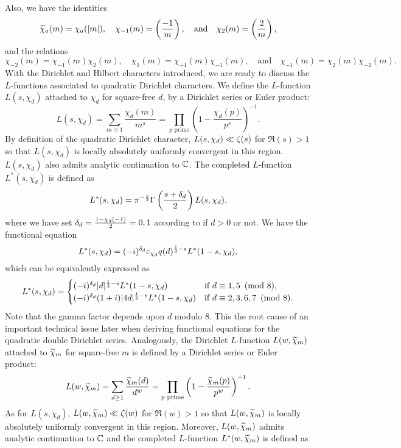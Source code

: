 \documentclass[12pt,reqno,oneside]{amsart}
\begin{document}
    Also, we have the identities
    \[
        \widetilde{\chi}_{a}(m) = \chi_{a}(|m|), \quad \chi_{-1}(m) = \left(\frac{-1}{m}\right), \quad \text{and} \quad \chi_{2}(m) = \left(\frac{2}{m}\right),
    \]
    and the relations
    \[
        \chi_{-2}(m) = \chi_{-1}(m)\chi_{2}(m), \quad \chi_{1}(m) = \chi_{-1}(m)\chi_{-1}(m), \quad \text{and} \quad \chi_{-1}(m) = \chi_{2}(m)\chi_{-2}(m).
    \]
    With the Dirichlet and Hilbert characters introduced, we are ready to discuss the $L$-functions associated to quadratic Dirichlet characters. We define the $L$-function $L(s,\chi_{d})$ attached to $\chi_{d}$ for square-free $d$, by a Dirichlet series or Euler product:
    \[
        L(s,\chi_{d}) = \sum_{m \ge 1}\frac{\chi_{d}(m)}{m^{s}} = \prod_{p \text{ prime}}\left(1-\frac{\chi_{d}(p)}{p^{s}}\right)^{-1}.
    \]
    By definition of the quadratic Dirichlet character, $L(s,\chi_{d}) \ll \zeta(s)$ for $\Re(s) > 1$ so that $L(s,\chi_{d})$ is locally absolutely uniformly convergent in this region. $L(s,\chi_{d})$ also admits analytic continuation to $\mathbb{C}$. The completed $L$-function $L^{\ast}(s,\chi_{d})$ is defined as
    \[
        L^{\ast}(s,\chi_{d}) = \pi^{-\frac{s}{2}}\Gamma\left(\frac{s+\delta_{d}}{2}\right)L(s,\chi_{d}),
    \]
    where we have set $\delta_{d} = \frac{1-\chi_{d}(-1)}{2} = 0,1$ according to if $d > 0$ or not. We have the functional equation
    \[
        L^{\ast}(s,\chi_{d}) = (-i)^{\delta_{d}}\varepsilon_{\chi_{d}}q(d)^{\frac{1}{2}-s}L^{\ast}(1-s,\chi_{d}),
    \]
    which can be equivalently expressed as
    \[
        L^{\ast}(s,\chi_{d}) = \begin{cases} (-i)^{\delta_{d}}|d|^{\frac{1}{2}-s}L^{\ast}(1-s,\chi_{d}) & \text{if $d \equiv 1,5 \ \left(\text{mod }8\right)$}, \\ (-i)^{\delta_{d}}(1+i)|4d|^{\frac{1}{2}-s}L^{\ast}(1-s,\chi_{d}) & \text{if $d \equiv 2,3,6,7 \ \left(\text{mod }8\right)$}. \end{cases}
    \]
    Note that the gamma factor depends upon $d$ modulo $8$. This the root cause of an important technical issue later when deriving functional equations for the quadratic double Dirichlet series. Analogously, the Dirichlet $L$-function $L(w,\widetilde{\chi}_{m})$ attached to $\widetilde{\chi}_{m}$ for square-free $m$ is defined by a Dirichlet series or Euler product:
    \[
        L(w,\widetilde{\chi}_{m}) = \sum_{d \ge 1}\frac{\widetilde{\chi}_{m}(d)}{d^{w}} = \prod_{p \text{ prime}}\left(1-\frac{\widetilde{\chi}_{m}(p)}{p^{w}}\right)^{-1}.
    \]
    As for $L(s,\chi_{d})$, $L(w,\widetilde{\chi}_{m}) \ll \zeta(w)$ for $\Re(w) > 1$ so that $L(w,\widetilde{\chi}_{m})$ is locally absolutely uniformly convergent in this region. Moreover, $L(w,\widetilde{\chi}_{m})$ admits analytic continuation to $\mathbb{C}$ and the completed $L$-function $L^{\ast}(w,\widetilde{\chi}_{m})$ is defined as
\end{document}
